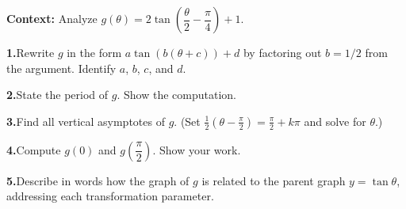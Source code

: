 \documentclass[10pt]{article}
\begin{document}
\vspace{0.06in}

\begin{tcolorbox}[colback=white, colframe=black!40,
    title=\textbf{Tier E --- Extension},
    fonttitle=\bfseries, arc=2mm, left=3mm, right=3mm, top=2mm, bottom=2mm]

\textbf{Context:} Analyze $g(\theta) = 2\tan\!\left(\dfrac{\theta}{2} - \dfrac{\pi}{4}\right) + 1$.

\vspace{6pt}
\textbf{1.}\quad Rewrite $g$ in the form $a\tan(b(\theta + c)) + d$ by factoring
out $b = 1/2$ from the argument.  Identify $a$, $b$, $c$, and $d$.

\vspace{4pt}
\textbf{2.}\quad State the period of $g$.  Show the computation.

\vspace{4pt}
\textbf{3.}\quad Find all vertical asymptotes of $g$.
(Set $\tfrac{1}{2}(\theta - \tfrac{\pi}{2}) = \tfrac{\pi}{2} + k\pi$ and solve for $\theta$.)

\vspace{4pt}
\textbf{4.}\quad Compute $g(0)$ and $g\!\left(\dfrac{\pi}{2}\right)$.  Show your work.

\vspace{4pt}
\textbf{5.}\quad Describe in words how the graph of $g$ is related to the parent
graph $y = \tan\theta$, addressing each transformation parameter.

\end{tcolorbox}
\end{document}
